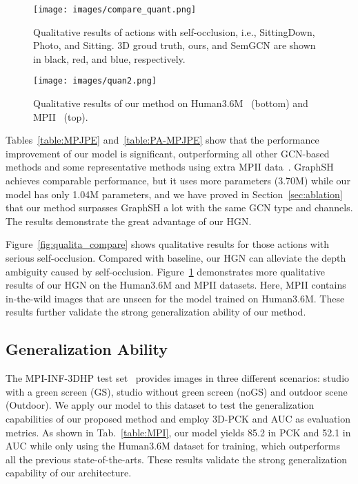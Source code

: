 \documentclass{bmvc2k}
\begin{document}
\begin{figure}[!t]
\renewcommand{\baselinestretch}{1.0}
\setlength{\abovecaptionskip}{-10pt}
\centering
\texttt{[image: images/compare\_quant.png]}
\caption{Qualitative results of actions with self-occlusion, i.e., SittingDown, Photo, and Sitting. 3D groud truth, ours, and SemGCN are shown in black, red, and blue, respectively.} \label{fig:qualita_compare}
\renewcommand{\baselinestretch}{1.0}
\setlength{\belowcaptionskip}{-10pt}
\centering
\texttt{[image: images/quan2.png]}
\caption{Qualitative results of our method on Human3.6M~\cite{ionescu2013human3} (bottom) and MPII~\cite{andriluka20142d} (top).}\label{fig:qualita}
\end{figure}

Tables~\ref{table:MPJPE} and~\ref{table:PA-MPJPE} show that the performance improvement of our model is significant, outperforming  all other GCN-based methods and some representative methods \cite{ci2019optimizing,2018Ordinal} using extra MPII data~\cite{andriluka20142d}. GraphSH~\cite{2021Graph} achieves comparable performance, but it uses more parameters (3.70M) while our model has only 1.04M parameters, and we have proved in Section~\ref{sec:ablation} that our method surpasses GraphSH a lot with the same GCN type and channels. The results demonstrate the great advantage of our HGN. 

Figure~\ref{fig:qualita_compare} shows qualitative results for those actions with serious self-occlusion. Compared with baseline, our HGN can alleviate the depth ambiguity caused by self-occlusion. Figure~\ref{fig:qualita} demonstrates more qualitative results of our HGN on the Human3.6M and MPII datasets. Here, MPII contains in-the-wild images that are unseen for the model trained on Human3.6M. These results further validate the strong generalization ability of our method.
\subsection{Generalization Ability}  
The MPI-INF-3DHP test set~\cite{mehta2017monocular} provides images in three different scenarios: studio with a green screen (GS), studio without green screen (noGS) and outdoor scene (Outdoor). We apply our model to this dataset to test the generalization capabilities of our proposed method and employ 3D-PCK and AUC as evaluation metrics.  As shown in Tab.~\ref{table:MPI}, our model yields 85.2 in PCK and 52.1 in
AUC while only using the Human3.6M dataset for training, which outperforms all the previous state-of-the-arts. These results validate the strong generalization capability of our architecture.
\end{document}
